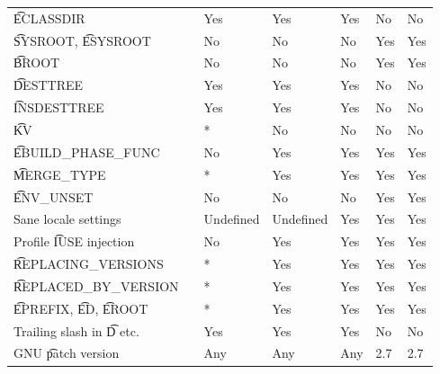 \begin{landscape}
\begin{longtable}{llP{7.5em}P{7.5em}P{7.5em}P{7.5em}P{7.5em}}
\t{ECLASSDIR} &  &
    Yes & Yes & Yes & No & No \\

\t{SYSROOT}, \t{ESYSROOT} &  &
    No & No & No & Yes & Yes \\

\t{BROOT} &  &
    No & No & No & Yes & Yes \\

\t{DESTTREE} &  &
    Yes & Yes & Yes & No & No \\

\t{INSDESTTREE} &  &
    Yes & Yes & Yes & No & No \\

\t{KV} &  &
    * & No & No & No & No \\

\t{EBUILD_PHASE_FUNC} &  &
    No & Yes & Yes & Yes & Yes \\

\t{MERGE_TYPE} &  &
    * & Yes & Yes & Yes & Yes \\

\t{ENV_UNSET} &  &
    No & No & No & Yes & Yes \\

Sane locale settings &  &
    Undefined & Undefined & Yes & Yes & Yes \\

Profile \t{IUSE} injection &  &
    No & Yes & Yes & Yes & Yes \\

\t{REPLACING_VERSIONS} &  &
    * & Yes & Yes & Yes & Yes \\

\t{REPLACED_BY_VERSION} &  &
    * & Yes & Yes & Yes & Yes \\

\t{EPREFIX}, \t{ED}, \t{EROOT} &  &
    * & Yes & Yes & Yes & Yes \\

Trailing slash in \t{D} etc. &  &
    Yes & Yes & Yes & No & No \\

GNU \t{patch} version &  &
    Any & Any & Any & 2.7 & 2.7 \\


\end{longtable}
\end{landscape}
